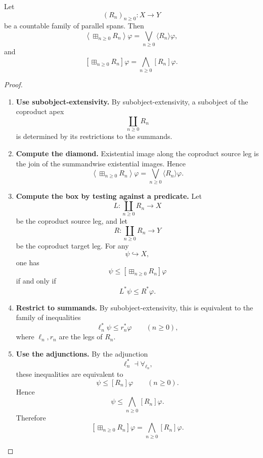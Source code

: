 \begin{lemma}
\label{lem:countable-coproduct-modalities-feedback}
Let
\[
  (R_n)_{n\geq 0}:X\to Y
\]
be a countable family of parallel spans. Then
\[
  \left\langle
    \boxplus_{n\geq 0}R_n
  \right\rangle\varphi
  =
  \bigvee_{n\geq 0}
  \langle R_n\rangle\varphi,
\]
and
\[
  \left[
    \boxplus_{n\geq 0}R_n
  \right]\varphi
  =
  \bigwedge_{n\geq 0}
  [R_n]\varphi.
\]
\end{lemma}

\begin{proof}
\begin{enumerate}
  \item \textbf{Use subobject-extensivity.}
  By subobject-extensivity, a subobject of the coproduct apex
  \[
    \coprod_{n\geq 0}R_n
  \]
  is determined by its restrictions to the summands.

  \item \textbf{Compute the diamond.}
  Existential image along the coproduct source leg is the join of the
  summandwise existential images. Hence
  \[
    \left\langle
      \boxplus_{n\geq 0}R_n
    \right\rangle\varphi
    =
    \bigvee_{n\geq 0}
    \langle R_n\rangle\varphi.
  \]

  \item \textbf{Compute the box by testing against a predicate.}
  Let
  \[
    L:\coprod_{n\geq 0}R_n\to X
  \]
  be the coproduct source leg, and let
  \[
    R:\coprod_{n\geq 0}R_n\to Y
  \]
  be the coproduct target leg. For any
  \[
    \psi\hookrightarrow X,
  \]
  one has
  \[
    \psi\leq
    \left[
      \boxplus_{n\geq 0}R_n
    \right]\varphi
  \]
  if and only if
  \[
    L^\ast\psi\leq R^\ast\varphi.
  \]

  \item \textbf{Restrict to summands.}
  By subobject-extensivity, this is equivalent to the family of inequalities
  \[
    \ell_n^\ast\psi\leq r_n^\ast\varphi
    \qquad(n\geq 0),
  \]
  where \(\ell_n,r_n\) are the legs of \(R_n\).

  \item \textbf{Use the adjunctions.}
  By the adjunction
  \[
    \ell_n^\ast\dashv\forall_{\ell_n},
  \]
  these inequalities are equivalent to
  \[
    \psi\leq [R_n]\varphi
    \qquad(n\geq 0).
  \]
  Hence
  \[
    \psi\leq
    \bigwedge_{n\geq 0}[R_n]\varphi.
  \]
  Therefore
  \[
    \left[
      \boxplus_{n\geq 0}R_n
    \right]\varphi
    =
    \bigwedge_{n\geq 0}
    [R_n]\varphi.
  \]
\end{enumerate}
\end{proof}

